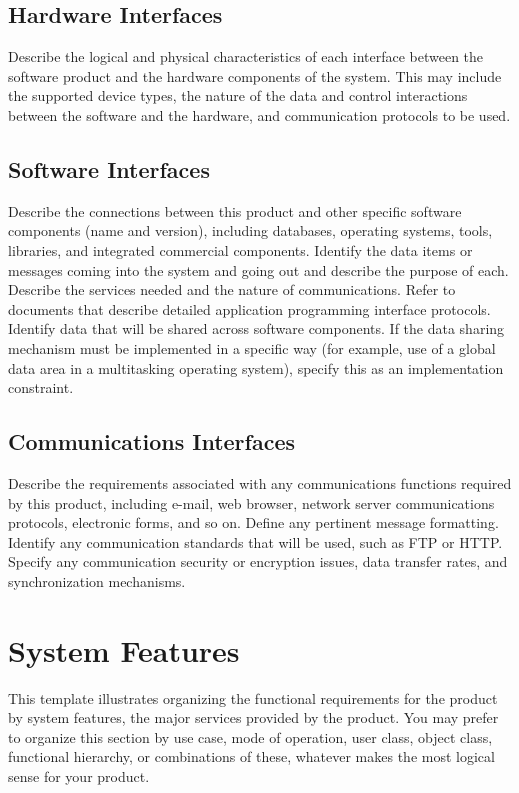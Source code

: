 \documentclass[a4paper,10pt]{article}
\begin{document}
\subsection{Hardware Interfaces}
Describe the logical and physical characteristics of each interface between the software product and the hardware components of the system. This may include the supported device types, the nature of the data and control interactions between the software and the hardware, and communication protocols to be used.
\subsection{Software Interfaces}
Describe the connections between this product and other specific software components (name and version), including databases, operating systems, tools, libraries, and integrated commercial components. Identify the data items or messages coming into the system and going out and describe the purpose of each. Describe the services needed and the nature of communications. Refer to documents that describe detailed application programming interface protocols. Identify data that will be shared across software components. If the data sharing mechanism must be implemented in a specific way (for example, use of a global data area in a multitasking operating system), specify this as an implementation constraint.
\subsection{Communications Interfaces}
Describe the requirements associated with any communications functions required by this product, including e-mail, web browser, network server communications protocols, electronic forms, and so on. Define any pertinent message formatting. Identify any communication standards that will be used, such as FTP or HTTP. Specify any communication security or encryption issues, data transfer rates, and synchronization mechanisms.


\section{System Features}
This template illustrates organizing the functional requirements for the product by system features, the major services provided by the product. You may prefer to organize this section by use case, mode of operation, user class, object class, functional hierarchy, or combinations of these, whatever makes the most logical sense for your product.
\end{document}
